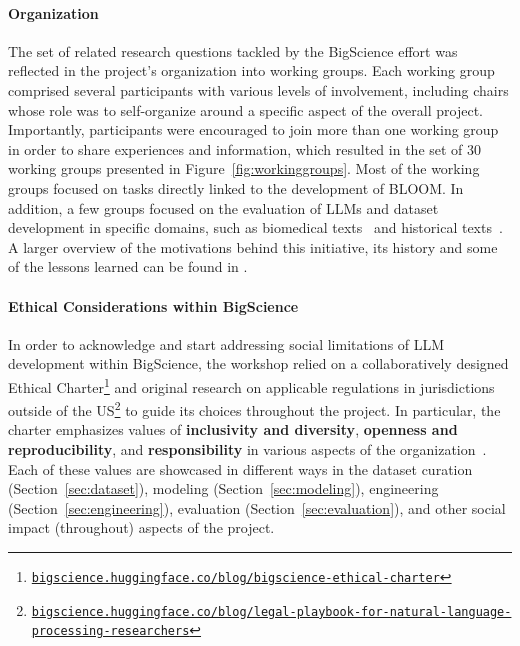 \paragraph{Organization}
The set of related research questions tackled by the BigScience effort was reflected in the project's organization into working groups. Each working group comprised several participants with various levels of involvement, including chairs whose role was to self-organize around a specific aspect of the overall project. Importantly, participants were encouraged to join more than one working group in order to share experiences and information, which resulted in the set of 30 working groups presented in Figure~\ref{fig:workinggroups}. Most of the working groups focused on tasks directly linked to the development of BLOOM. In addition, a few groups focused on the evaluation of LLMs and dataset development in specific domains, such as biomedical texts~\citep{bigbio} and historical texts~\citep{de-toni-etal-2022-entities}. A larger overview of the motivations behind this initiative, its history and some of the lessons learned can be found in \citet{bigscience2022org}.

\paragraph{Ethical Considerations within BigScience} In order to acknowledge and start addressing social limitations of LLM development within BigScience, the workshop relied on a collaboratively designed Ethical Charter\footnote{\href{https://bigscience.huggingface.co/blog/bigscience-ethical-charter}{\texttt{bigscience.huggingface.co/blog/bigscience-ethical-charter}}} and original research on applicable regulations in jurisdictions outside of the US\footnote{\href{https://bigscience.huggingface.co/blog/legal-playbook-for-natural-language-processing-researchers}{\texttt{bigscience.huggingface.co/blog/legal-playbook-for-natural-language-processing-researchers}}} to guide its choices throughout the project. In particular, the charter emphasizes values of \textbf{inclusivity and diversity}, \textbf{openness and reproducibility}, and \textbf{responsibility} in various aspects of the organization~\citep{bigscience2022org}. Each of these values are showcased in different ways in the dataset curation (Section~\ref{sec:dataset}), modeling (Section~\ref{sec:modeling}), engineering (Section~\ref{sec:engineering}), evaluation (Section~\ref{sec:evaluation}), and other social impact (throughout) aspects of the project.

